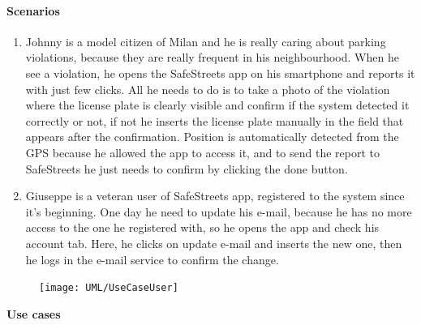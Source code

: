 \paragraph{Scenarios}
    \begin{enumerate}
        \item Johnny is a model citizen of Milan and he is really caring about parking violations, because they are really frequent in his neighbourhood. When he see a violation, he opens the SafeStreets app on his smartphone and reports it with just few clicks. All he needs to do is to take a photo of the violation where the license plate is clearly visible and confirm if the system detected it correctly or not, if not he inserts the license plate manually in the field that appears after the confirmation. Position is automatically detected from the GPS because he allowed the app to access it, and to send the report to SafeStreets he just needs to confirm by clicking the done button.
        
        \item Giuseppe is a veteran user of SafeStreets app, registered to the system since it's beginning. One day he need to update his e-mail, because he has no more access to the one he registered with, so he opens the app and check his account tab. Here, he clicks on update e-mail and inserts the new one, then he logs in the e-mail service to confirm the change.
    \end{enumerate}

\begin{figure}[H]
	\centering
    \texttt{[image: UML/UseCaseUser]}
\end{figure}	

\textbf{Use cases}\\

